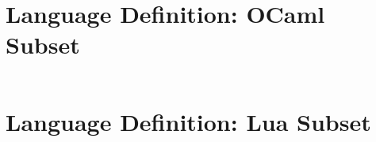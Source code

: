 \documentclass{kththesis}
\begin{document}
\printbibliography[heading=bibintoc]

\appendix

\chapter{Language Definition: OCaml Subset} \label{sec:appendix-ocaml}

\inputminted{syncon}{implementation/languages/ocaml/language}

\chapter{Language Definition: Lua Subset} \label{sec:appendix-lua}

\inputminted{syncon}{implementation/languages/lua/language}
\end{document}
